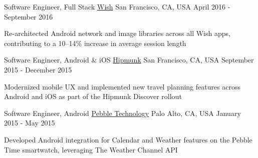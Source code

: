\begin{center}
  \vspace{-3.4mm}
  \cventry
    {Software Engineer, Full Stack}
    {\href{https://wish.com/mobile-apps}{Wish}}
    {San Francisco, CA, USA}
    {April 2016 - September 2016}
    {
      \begin{cvitems}
        \item {Re-architected Android network and image libraries across all Wish apps, contributing to a 10–14\% increase in average session length}
      \end{cvitems}
    }
\end{center}
\begin{center}
  \vspace{-3.4mm}
  \cventry
    {Software Engineer, Android \& iOS}
    {\href{https://hipmunk.com/mobile}{Hipmunk}}
    {San Francisco, CA, USA}
    {September 2015 - December 2015}
    {
      \begin{cvitems}
        \item {Modernized mobile UX and implemented new travel planning features across Android and iOS as part of the Hipmunk Discover rollout}
      \end{cvitems}
    }
\end{center}
\begin{center}
  \vspace{-3.4mm}
  \cventry
    {Software Engineer, Android}
    {\href{https://pebble.com/apps}{Pebble Technology}}
    {Palo Alto, CA, USA}
    {January 2015 - May 2015}
    {
      \begin{cvitems}
        \item {Developed Android integration for Calendar and Weather features on the Pebble Time smartwatch, leveraging The Weather Channel API}
      \end{cvitems}
    }
\end{center}
